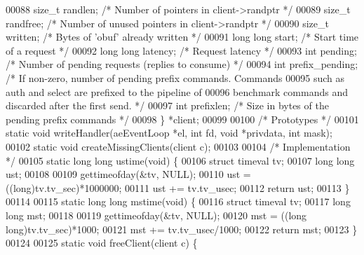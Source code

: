 \begin{DoxyCode}
00088     size\_t randlen;         \textcolor{comment}{/* Number of pointers in client->randptr */}
00089     size\_t randfree;        \textcolor{comment}{/* Number of unused pointers in client->randptr */}
00090     size\_t written;         \textcolor{comment}{/* Bytes of 'obuf' already written */}
00091     \textcolor{keywordtype}{long} \textcolor{keywordtype}{long} start;        \textcolor{comment}{/* Start time of a request */}
00092     \textcolor{keywordtype}{long} \textcolor{keywordtype}{long} latency;      \textcolor{comment}{/* Request latency */}
00093     \textcolor{keywordtype}{int} pending;            \textcolor{comment}{/* Number of pending requests (replies to consume) */}
00094     \textcolor{keywordtype}{int} prefix\_pending;     \textcolor{comment}{/* If non-zero, number of pending prefix commands. Commands}
00095 \textcolor{comment}{                               such as auth and select are prefixed to the pipeline of}
00096 \textcolor{comment}{                               benchmark commands and discarded after the first send. */}
00097     \textcolor{keywordtype}{int} prefixlen;          \textcolor{comment}{/* Size in bytes of the pending prefix commands */}
00098 \} *client;
00099 
00100 \textcolor{comment}{/* Prototypes */}
00101 \textcolor{keyword}{static} \textcolor{keywordtype}{void} writeHandler(aeEventLoop *el, \textcolor{keywordtype}{int} fd, \textcolor{keywordtype}{void} *privdata, \textcolor{keywordtype}{int} mask);
00102 \textcolor{keyword}{static} \textcolor{keywordtype}{void} createMissingClients(client c);
00103 
00104 \textcolor{comment}{/* Implementation */}
00105 \textcolor{keyword}{static} \textcolor{keywordtype}{long} \textcolor{keywordtype}{long} ustime(\textcolor{keywordtype}{void}) \{
00106     \textcolor{keyword}{struct} timeval tv;
00107     \textcolor{keywordtype}{long} \textcolor{keywordtype}{long} ust;
00108 
00109     gettimeofday(&tv, NULL);
00110     ust = ((\textcolor{keywordtype}{long})tv.tv\_sec)*1000000;
00111     ust += tv.tv\_usec;
00112     \textcolor{keywordflow}{return} ust;
00113 \}
00114 
00115 \textcolor{keyword}{static} \textcolor{keywordtype}{long} \textcolor{keywordtype}{long} mstime(\textcolor{keywordtype}{void}) \{
00116     \textcolor{keyword}{struct} timeval tv;
00117     \textcolor{keywordtype}{long} \textcolor{keywordtype}{long} mst;
00118 
00119     gettimeofday(&tv, NULL);
00120     mst = ((\textcolor{keywordtype}{long} \textcolor{keywordtype}{long})tv.tv\_sec)*1000;
00121     mst += tv.tv\_usec/1000;
00122     \textcolor{keywordflow}{return} mst;
00123 \}
00124 
00125 \textcolor{keyword}{static} \textcolor{keywordtype}{void} freeClient(client c) \{

\end{DoxyCode}
